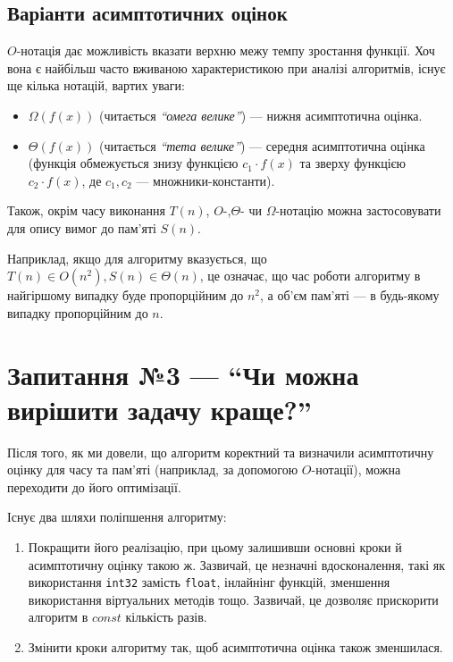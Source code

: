 \documentclass[12pt,a4paper]{report}
\begin{document}
\subsection*{Варіанти асимптотичних оцінок}

\(O\)-нотація дає можливість вказати верхню межу темпу зростання функції.
Хоч вона є найбільш часто вживаною характеристикою при аналізі алгоритмів, існує ще кілька нотацій, вартих уваги:

\begin{itemize}
    \item \(\Omega(f(x))\) (читається {\itshape ``омега велике''}) --- нижня асимптотична оцінка.
    \item \(\Theta(f(x))\) (читається {\itshape ``тета велике''}) --- середня асимптотична оцінка (функція обмежується знизу функцією \(c_1 \cdot f(x)\) та зверху функцією \(c_2 \cdot f(x)\), де \(c_1, c_2\) --- множники-константи).
\end{itemize}

Також, окрім часу виконання \(T(n)\), \(O\)-,\(\Theta\)- чи \(\Omega\)-нотацію можна застосовувати для опису вимог до пам’яті \(S(n)\).

Наприклад, якщо для алгоритму вказується, що \(T(n) \in O(n^2), S(n) \in \Theta(n)\), це означає, що час роботи алгоритму в найгіршому випадку буде пропорційним до \(n^2\), а об’єм пам’яті --- в будь-якому випадку пропорційним до \(n\).



\section{Запитання №3 --- ``Чи можна вирішити задачу краще?''}

Після того, як ми довели, що алгоритм коректний та визначили асимптотичну оцінку для часу та пам’яті (наприклад, за допомогою \(O\)-нотації), можна переходити до його оптимізації.

Існує два шляхи поліпшення алгоритму:

\begin{enumerate}
    \item Покращити його реалізацію, при цьому залишивши основні кроки й асимптотичну оцінку такою ж. Зазвичай, це незначні вдосконалення, такі як використання \texttt{int32} замість \texttt{float}, інлайнінг функцій, зменшення використання віртуальних методів тощо. Зазвичай, це дозволяє прискорити алгоритм в \(const\) кількість разів.
    \item Змінити кроки алгоритму так, щоб асимптотична оцінка також зменшилася.
\end{enumerate}
\end{document}
